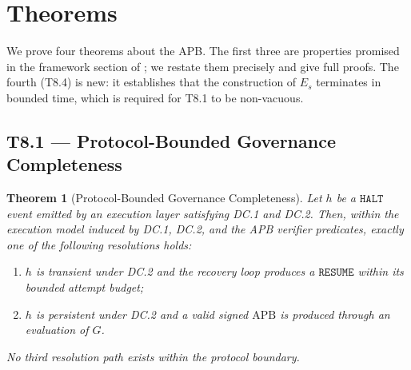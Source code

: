 \documentclass[11pt]{article}
\newtheorem{theorem}{Theorem}[section]
\newcommand{\HALT}{\texttt{HALT}}
\newcommand{\RESUME}{\texttt{RESUME}}
\newcommand{\Es}{E_s}
\newcommand{\APB}{\mathrm{APB}}
\begin{document}
\section{Theorems}
\label{sec:theorems}

We prove four theorems about the APB. The first three are
properties promised in the framework section of
\citep{fernandez2026applied}; we restate them precisely and give full
proofs. The fourth (T8.4) is new: it establishes that the construction
of $\Es$ terminates in bounded time, which is required for T8.1 to be
non-vacuous.

\subsection{T8.1 --- Protocol-Bounded Governance Completeness}
\label{sec:t81}

\begin{theorem}[Protocol-Bounded Governance Completeness]
\label{thm:completeness}
Let $h$ be a $\HALT$ event emitted by an execution layer satisfying
DC.1 and DC.2. Then, within the execution model induced by DC.1, DC.2,
and the APB verifier predicates, exactly one of the following
resolutions holds:
\begin{enumerate}[leftmargin=2em, topsep=2pt, itemsep=1pt]
  \item[(R1)] $h$ is transient under DC.2 and the recovery loop
        produces a $\RESUME$ within its bounded attempt budget;
  \item[(R2)] $h$ is persistent under DC.2 and a valid signed
        $\APB$ is produced through an evaluation of $G$.
\end{enumerate}
No third resolution path exists within the protocol boundary.
\end{theorem}
\end{document}
